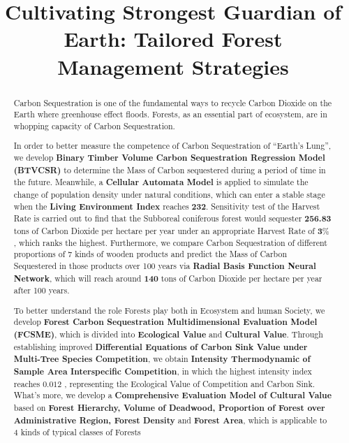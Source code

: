 \documentclass{mcmthesis}
\title{Cultivating Strongest Guardian of Earth: Tailored Forest Management Strategies}
\numberwithin{figure}{section}
\numberwithin{table}{section}
\numberwithin{equation}{section}
\begin{document}
\renewcommand{\algorithmicrequire}{\textbf{Input:}}  %
\renewcommand{\algorithmicensure}{\textbf{Output:}} %
\begin{abstract}

  Carbon Sequestration is one of the fundamental ways to recycle Carbon Dioxide on the Earth where 
  greenhouse effect floods. Forests, as an essential part of ecosystem, are 
  in whopping capacity of Carbon Sequestration. 
  \par
  In order to better measure the competence of Carbon Sequestration of “Earth's 
  Lung”, we develop \textbf{Binary Timber Volume Carbon Sequestration Regression Model (BTVCSR)} to 
  determine the Mass of Carbon sequestered during a period of time in the future.
  Meanwhile, a \textbf{Cellular Automata Model} is applied to 
  simulate the change of population density under natural conditions, which can 
  enter a stable stage when the \textbf{Living Environment Index} reaches \textbf{232}. 
  Sensitivity test of the Harvest Rate is carried out to find that the Subboreal 
  coniferous forest would sequester \textbf{256.83} tons of Carbon Dioxide per hectare per year 
  under an appropriate Harvest Rate of $ \bm{3\%} $ , which ranks the highest. 
  Furthermore, we compare Carbon Sequestration of different proportions of 7 kinds of wooden products 
  and predict the Mass of Carbon Sequestered in those products over 100 years 
  via \textbf{Radial Basis Function Neural Network}, which will reach around 
  \textbf{140} tons of Carbon Dioxide per hectare per year after 100 years. 
  \par
  To better understand the role Forests play both in Ecosystem and human 
  Society, we develop \textbf{Forest Carbon 
  Sequestration Multidimensional Evaluation Model (FCSME)}, which is 
  divided into \textbf{Ecological Value} and \textbf{Cultural Value}. Through establishing improved 
 \textbf{ Differential Equations of Carbon Sink Value under Multi-Tree Species Competition},
  we obtain \textbf{Intensity Thermodynamic of Sample Area Interspecific Competition}, 
  in which the highest intensity index reaches $ \bm{0.012} $ , representing the Ecological 
  Value of Competition and Carbon Sink. What's more, we develop a \textbf{Comprehensive 
  Evaluation Model of Cultural Value} based on\textbf{ Forest Hierarchy, Volume of 
  Deadwood, Proportion of Forest over Administrative Region, Forest Density} 
  and \textbf{Forest Area}, which is applicable to 4 kinds of typical classes of Forests 

\end{abstract}
\end{document}
